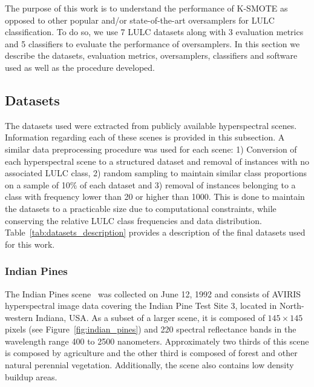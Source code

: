 \documentclass[parskip=full]{scrartcl}
\begin{document}
The purpose of this work is to understand the performance of K-SMOTE as
opposed to other popular and/or state-of-the-art oversamplers for LULC
classification. To do so, we use 7 LULC datasets along with 3 evaluation
metrics and 5 classifiers to evaluate the performance of oversamplers. In this
section we describe the datasets, evaluation metrics, oversamplers,
classifiers and software used as well as the procedure developed.

\subsection{Datasets}

The datasets used were extracted from publicly available hyperspectral scenes.
Information regarding each of these scenes is provided in this subsection. A
similar data preprocessing procedure was used for each scene: 1) Conversion of
each hyperspectral scene to a structured dataset and removal of instances with
no associated LULC class, 2) random sampling to maintain similar class
proportions on a sample of 10\% of each dataset and 3) removal of instances
belonging to a class with frequency lower than 20 or higher than 1000. This is
done to maintain the datasets to a practicable size due to computational
constraints, while conserving the relative LULC class frequencies and data
distribution. Table~\ref{tab:datasets_description} provides a description of the
final datasets used for this work.


\subsubsection*{Indian Pines} 

The Indian Pines scene~\cite{Baumgardner2015} was collected on June 12, 1992 and
consists of AVIRIS hyperspectral image data covering the Indian Pine Test Site
3, located in North-western Indiana, USA. As a subset of a larger scene, it is
composed of $145 \times 145$ pixels (see Figure~\ref{fig:indian_pines}) and 220
spectral reflectance bands in the wavelength range 400 to 2500 nanometers.
Approximately two thirds of this scene is composed by agriculture and the other
third is composed of forest and other natural perennial vegetation.
Additionally, the scene also contains low density buildup areas.
\end{document}
